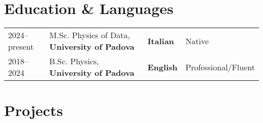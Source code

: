 \documentclass[a4paper,10pt]{article}
\begin{document}
\section{Education \& Languages}
\begin{tabularx}{\linewidth}{@{}l X l X@{}}
2024--present & M.Sc. Physics of Data, \textbf{University of Padova} & \textbf{Italian} & Native \\
2018--2024 & B.Sc. Physics, \textbf{University of Padova} & \textbf{English} & Professional/Fluent \\
\end{tabularx}

\section{Projects}
\end{document}
